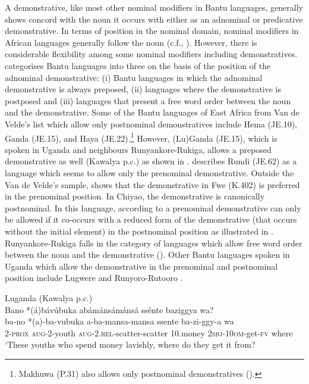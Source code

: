 \documentclass[output=paper 		  ]{langscibook}
\begin{document}
A demonstrative, like most other nominal modifiers in Bantu languages, generally shows concord with the noun it occurs with either as an adnominal or predicative demonstrative. In terms of position in the nominal domain, nominal modifiers in African languages generally follow the noun (c.f., \citealt{Zeller2020}). However, there is considerable flexibility among some nominal modifiers including demonstratives.  \citet{VandeVelde2005} categorises Bantu languages into three on the basis of the position of the adnominal demonstrative: (i) Bantu languages in which the adnominal demonstrative is always preposed, (ii) languages where the demonstrative is postposed and (iii) languages that present a free word order between the noun and the demonstrative. Some of the Bantu languages of East Africa from Van de Velde’s list which allow only postnominal demonstratives include Hema (JE.10), Ganda (JE.15), and Haya (JE.22).\footnote{\textrm{Makhuwa (P.31) also allows only postnominal demonstratives (\citealt{vanderWal2010}).}} However, (Lu)Ganda (JE.15), which is spoken in Uganda and neighbours Run\-yan\-ko\-re-Ru\-ki\-ga, allows a preposed demonstrative as well (Kawalya p.c.) as shown in . \citet{VandeVelde2005} describes Rundi (JE.62) as a language which seems to allow only the prenominal demonstrative. Outside the Van de Velde’s sample, \citet{Gunnink2018} shows that the demonstrative in Fwe (K.402) is preferred in the prenominal position. In Chiyao, the demonstrative is canonically postnominal. In this language,  according to  a prenominal demonstrative can only be allowed if it co-occurs with a reduced form of the demonstrative (that occurs without the initial element) in the postnominal position  as illustrated in . Run\-yan\-ko\-re-Ru\-ki\-ga falls in the category of languages which allow free word order between the noun and the demonstrative (\citealt{Taylor1985, DeBlois1970, VandeVelde2005, Asiimwe2014}). Other Bantu languages spoken in Uganda which allow the demonstrative in the prenominal and postnominal position include Lugwere \citep{AhnvanderWal2019} and Runyoro-Rutooro \citep{Rubongoya1999}.

\ea%
    \label{ex:asiimwe:30}Luganda (Kawalya p.c.)\\
    Bano *(á)bávúbuka abámánsámánsá ssénte baziggya wa?\\
 \gll ba-no  *(a)-ba-vubuka  a-ba-mansa-mansa  ssente  ba-zi-ggy-a  wa\\
2-\textsc{prox}  \textsc{aug}{}-2-youth  \textsc{aug}{}-2.\textsc{rel}{}-scatter-scatter
10.money  \textsc{2sbj-}10\textsc{om}{}-get-\textsc{fv}  where\\
    \glt ‘These youths who spend money lavishly, where do they get it from?
\z
\end{document}
